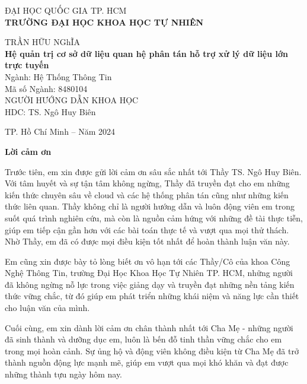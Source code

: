 \documentclass[14pt]{article}
\begin{document}
\begin{mdframed}[linewidth=1pt, linecolor=black, innerleftmargin=10mm, innerrightmargin=10mm, innertopmargin=10mm, innerbottommargin=10mm]
        \centering
        \vspace*{1cm}
        
        \Large ĐẠI HỌC QUỐC GIA TP. HCM\\
    \vspace{0.25cm}
    \Large \textbf{TRƯỜNG ĐẠI HỌC KHOA HỌC TỰ NHIÊN}\\
        
        \vspace{2cm}
        
        TRẦN HỮU NGhĨA\\[3cm]
        
        \textbf{Hệ quản trị cơ sở dữ liệu quan hệ phân tán
hỗ trợ xử lý dữ liệu lớn trực tuyến}\\[2cm]
        
        Ngành: Hệ Thống Thông Tin\\
        Mã số Ngành: 8480104\\[2cm]
        
        NGƯỜI HƯỚNG DẪN KHOA HỌC\\
        HDC: TS. Ngô Huy Biên

           TP. Hồ Chí Minh – Năm 2024
    \end{mdframed}
    \vfill
    
 

    
\pagebreak

    \begin{center}
\textbf{Lời cảm ơn}
\end{center}

    
    {
    Trước tiên, em xin được gửi lời cảm ơn sâu sắc nhất tới Thầy TS. Ngô Huy Biên. Với tâm huyết và sự tận tâm không ngừng, Thầy đã truyền đạt cho em những kiến thức chuyên sâu về cloud và các hệ thống phân tán cũng như những kiến thức liên quan. Thầy không chỉ là người hướng dẫn và luôn động viên em trong suốt quá trình nghiên cứu, mà còn là nguồn cảm hứng với những đề tài thực tiễn, giúp em tiếp cận gần hơn với các bài toán thực tế và vượt qua mọi thử thách. Nhờ Thầy, em đã có được mọi điều kiện tốt nhất để hoàn thành luận văn này.

Em cũng xin được bày tỏ lòng biết ơn vô hạn tới các Thầy/Cô của khoa Công Nghệ Thông Tin, trường Đại Học Khoa Học Tự Nhiên TP. HCM, những người đã không ngừng nỗ lực trong việc giảng dạy và truyền đạt những nền tảng kiến thức vững chắc, từ đó giúp em phát triển những khái niệm và năng lực cần thiết cho luận văn của mình.

Cuối cùng, em xin dành lời cảm ơn chân thành nhất tới Cha Mẹ - những người đã sinh thành và dưỡng dục em, luôn là bến đỗ tinh thần vững chắc cho em trong mọi hoàn cảnh. Sự ủng hộ và động viên không điều kiện từ Cha Mẹ đã trở thành nguồn động lực mạnh mẽ, giúp em vượt qua mọi khó khăn và đạt được những thành tựu ngày hôm nay.
    }
\end{document}
